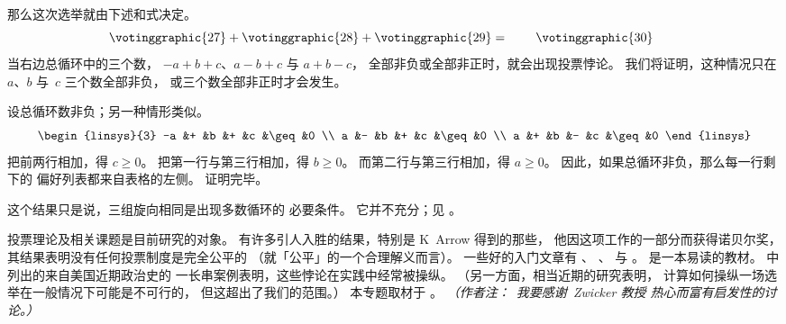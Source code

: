 那么这次选举就由下述和式决定。
\begin{equation*}
  \votinggraphic{27}  %
  +  
  \votinggraphic{28}  %
  +  
  \votinggraphic{29}  %
  =\hspace{.30in}
  \votinggraphic{30}  %
  \hspace{.30in}\hbox{}
\end{equation*}
当右边总循环中的三个数，
$-a+b+c$、$a-b+c$ 与 $a+b-c$，
全部非负或全部非正时，就会出现投票悖论。
我们将证明，这种情况只在
$a$、$b$ 与~$c$ 三个数全部非负，
或三个数全部非正时才会发生。

设总循环数非负；另一种情形类似。
\begin{equation*}
  \begin{linsys}{3}
    -a &+ &b &+ &c &\geq &0 \\
     a &- &b &+ &c &\geq &0 \\
     a &+ &b &- &c &\geq &0 
  \end{linsys}
\end{equation*}
把前两行相加，得 $c\geq 0$。
把第一行与第三行相加，得 $b\geq 0$。
而第二行与第三行相加，得 $a\geq 0$。
因此，如果总循环非负，那么每一行剩下的
偏好列表都来自表格的左侧。
证明完毕。

这个结果只是说，三组旋向相同是出现多数循环的
必要条件。
它并不充分；见
。

投票理论及相关课题是目前研究的对象。
有许多引人入胜的结果，特别是
K~Arrow \cite{Arrow} 得到的那些，
他因这项工作的一部分而获得诺贝尔奖，
其结果表明没有任何投票制度是完全公平的
（就「公平」的一个合理解义而言）。
一些好的入门文章有 \cite{Gardner70}、
\cite{Gardner74}、\cite{Gardner80} 与 \cite{NeimiRiker}。
\cite{Taylor} 是一本易读的教材。
\cite{GamingVote} 中列出的来自美国近期政治史的
一长串案例表明，这些悖论在实践中经常被操纵。
（另一方面，相当近期的研究表明，
计算如何操纵一场选举在一般情况下可能是不可行的，
但这超出了我们的范围。）
本专题取材于 \cite{Zwicker}。
\emph{（作者注：~我要感谢~Zwicker 教授
热心而富有启发性的讨论。）}

